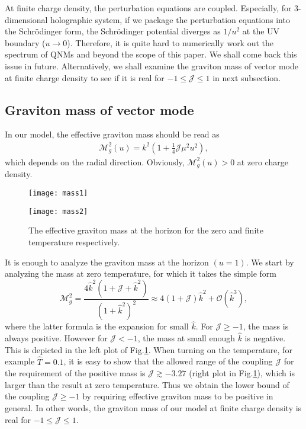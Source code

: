 \documentclass[preprint,onecolumn,nofootinbib]{revtex4}
\newcommand{\fa}{\begin{eqnarray}}
\newcommand{\ffa}{\end{eqnarray}}
\begin{document}
At finite charge density, the perturbation equations are coupled. Especially, for 3-dimensional holographic system, if we package the perturbation equations into the Schr\"odinger form, the Schr\"odinger potential diverges as $1/u^2$ at the UV boundary ($u\rightarrow 0$).
Therefore, it is quite hard to numerically work out the spectrum of QNMs and beyond the scope of this paper. We shall come back this issue in future. Alternatively, we shall examine the graviton mass of vector mode at finite charge density to see if it is real for $-1\leq\mathcal{J}\leq 1$ in next subsection. 


\subsection{Graviton mass of vector mode}

In our model, the effective graviton mass should be read as \cite{Gouteraux:2016wxj,Li:2018vrz}
\fa
	\mathcal{M}^2_g(u)=k^2\left(1+\frac{1}{4}\mathcal{J}\mu^2u^2\right),
	\label{mass0}
\ffa 
which depends on the radial direction. Obviously, $\mathcal{M}^2_g(u)>0$ at zero charge density.

\begin{figure}[H]
	\begin{minipage}[t]{0.5\linewidth}
		\centering
		\texttt{[image: mass1]}
	\end{minipage}
	\begin{minipage}[t]{0.5\linewidth}
		\centering
		\texttt{[image: mass2]}
	\end{minipage}
	\caption{The effective graviton mass at the horizon for the zero and finite temperature respectively.}
	\label{mass}
\end{figure}
It is enough to analyze the graviton mass at the horizon $(u=1)$.
We start by analyzing the mass at zero temperature, for which it takes the simple form
\begin{equation}
	\mathcal{M}_g^2=\frac{4\hat{k}^2(1+\mathcal{J}+\hat{k}^2)}{(1+\hat{k}^2)^2}\approx4(1+\mathcal{J})\hat{k}^2+\mathcal{O}(\hat{k}^3),
\end{equation}
where the latter formula is the expansion for small $\hat{k}$. For $\mathcal{J}\geq-1$, the mass is always positive. However for $\mathcal{J}<-1$, the mass at small enough $\hat{k}$ is negative. This is depicted in the left plot of Fig.\ref{mass}. When turning on the temperature, for example $\hat{T}=0.1$, it is easy to show that the allowed range of the coupling $\mathcal{J}$ for the requirement of the positive mass is $\mathcal{J}\gtrsim -3.27$ (right plot in Fig.\ref{mass}), which is larger than the result at zero temperature. Thus we obtain the lower bound of the coupling $\mathcal{J}\geq-1$ by requiring effective graviton mass to be positive in general. In other words, the graviton mass of our model at finite charge density is real for $-1\leq\mathcal{J}\leq 1$. 


 


\end{document}
